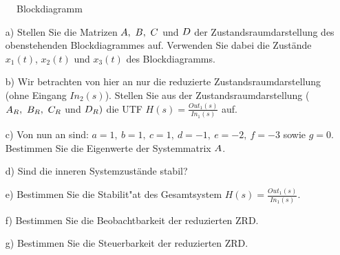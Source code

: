 {%
\aufg
\begin{figure}[!htb]
\vspace*{-4mm}
\begin{center}\caption{Blockdiagramm}\end{center}%
\end{figure}
\begin{enumerate}
\item[a)] Stellen Sie die Matrizen ${\boldmath A,~B,~C}$ und ${\boldmath D}$ der Zustandsraumdarstellung des obenstehenden Blockdiagrammes auf. Verwenden Sie dabei die Zust\"ande $x_1(t)$, $x_2(t)$ und $x_3(t)$ des Blockdiagramms.
\item[b)] Wir betrachten von hier an nur die reduzierte Zustandsraumdarstellung (ohne Eingang $In_2(s)$).  Stellen Sie aus der Zustandsraumdarstellung (${\boldmath A_R,~B_R,~C_R}$ und ${\boldmath D_R})$ die UTF $H(s)=\frac{Out_1(s)}{In_1(s)}$ auf.
\item[c)] Von nun an sind: $a=1,~b=1,~c=1,~d=-1,~e=-2,~f=-3$ sowie $g=0$. Bestimmen Sie die Eigenwerte der Systemmatrix ${\boldmath A}$.
\item[d)] Sind die inneren Systemzust\"ande stabil?
\item[e)] Bestimmen Sie die Stabilit"at des Gesamtsystem $H(s)=\frac{Out_1(s)}{In_1(s)}$.
\item[f)] Bestimmen Sie die Beobachtbarkeit der reduzierten ZRD.
\item[g)] Bestimmen Sie die Steuerbarkeit der reduzierten ZRD.
\end{enumerate}

\newpage
}
